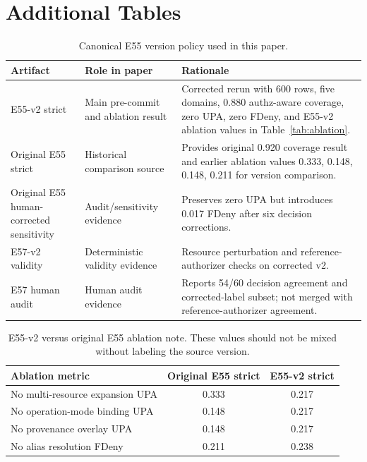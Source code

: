 \section{Additional Tables}

\begin{table}[ht]
\centering
\small
\caption{Canonical E55 version policy used in this paper.}
\label{tab:e55-version-policy}
\begin{tabularx}{\textwidth}{l l X}
\toprule
Artifact & Role in paper & Rationale \\
\midrule
E55-v2 strict & Main pre-commit and ablation result & Corrected rerun with 600 rows, five domains, 0.880 authz-aware coverage, zero UPA, zero FDeny, and E55-v2 ablation values in Table~\ref{tab:ablation}. \\
Original E55 strict & Historical comparison source & Provides original 0.920 coverage result and earlier ablation values 0.333, 0.148, 0.148, 0.211 for version comparison. \\
Original E55 human-corrected sensitivity & Audit/sensitivity evidence & Preserves zero UPA but introduces 0.017 FDeny after six decision corrections. \\
E57-v2 validity & Deterministic validity evidence & Resource perturbation and reference-authorizer checks on corrected v2. \\
E57 human audit & Human audit evidence & Reports 54/60 decision agreement and corrected-label subset; not merged with reference-authorizer agreement. \\
\bottomrule
\end{tabularx}
\end{table}

\begin{table}[ht]
\centering
\small
\caption{E55-v2 versus original E55 ablation note. These values should not be mixed without labeling the source version.}
\label{tab:e55-v2-ablation-note}
\begin{tabular}{lcc}
\toprule
Ablation metric & Original E55 strict & E55-v2 strict \\
\midrule
No multi-resource expansion UPA & 0.333 & 0.217 \\
No operation-mode binding UPA & 0.148 & 0.217 \\
No provenance overlay UPA & 0.148 & 0.217 \\
No alias resolution FDeny & 0.211 & 0.238 \\
\bottomrule
\end{tabular}
\end{table}

